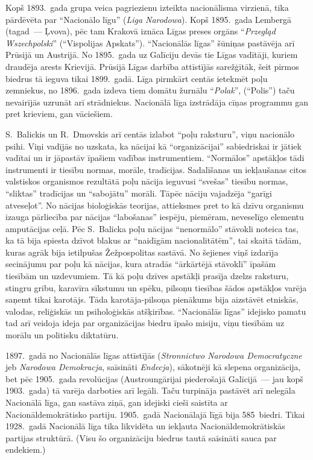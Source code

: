 \documentclass[twoside,a5paper,12pt,fleqn,openany]{extbook}
\newcommand{\pltxti}[1]{\textit{\textpolish{#1}}}
\begin{document}
Kopš 1893.~gada grupa veica pagriezienu izteikta nacionālisma virzienā, tika pārdēvēta par ``Nacionālo līgu'' (\pltxti{Liga Narodowa}). Kopš 1895.~gada Lembergā (tagad~--- Ļvova), pēc tam Krakovā iznāca Līgas preses orgāns ``\pltxti{Przegląd Wszechpolski}'' (``Vispolijas Apskats''). ``Nacionālās līgas'' šūniņas pastāvēja arī Prūsijā un Austrijā. No 1895.~gada uz Galīciju devās tie Līgas vadītāji, kuriem draudēja arests Krievijā. Prūsijā Līgas darbība attīstījās sarežģītāk, šeit pirmos biedrus tā ieguva tikai 1899.~gadā. Līga pirmkārt centās ietekmēt poļu zemniekus, no 1896.~gada izdeva tiem domātu žurnālu ``\pltxti{Polak}'', (``Polis'') taču nevairījās uzrunāt arī strādniekus. Nacionālā līga izstrādāja cīņas programmu gan pret krieviem, gan vāciešiem.

S.~Balickis un R.~Dmovskis arī centās izlabot ``poļu raksturu'', viņu nacionālo psihi. Viņi vadījās no uzskata, ka nācijai kā ``organizācijai'' sabiedriskai ir jātiek vadītai un ir jāpastāv īpašiem vadības instrumentiem. ``Normālos'' apstākļos tādi instrumenti ir tiesību normas, morāle, tradīcijas. Sadalīšanas un iekļaušanas citos valstiskos organismos rezultātā poļu nācija ieguvusi ``svešas'' tiesību normas, ``sliktas'' tradīcijas un ``sabojātu'' morāli. Tāpēc nāciju vajadzēja ``garīgi atveseļot''. No nācijas bioloģiskās teorijas, attieksmes pret to kā dzīvu organismu izauga pārliecība par nācijas ``labošanas'' iespēju, piemēram, neveselīgo elementu amputācijas ceļā. Pēc S.~Balicka poļu nācijas ``nenormālo'' stāvokli noteica tas, ka tā bija spiesta dzīvot blakus ar ``naidīgām nacionalitātēm'', tai skaitā tādām, kuras agrāk bija ietilpušas Žežpospolitas sastāvā. No šejienes viņš izdarīja secinājumu par poļu kā nācijas, kura atradās ``ārkārtējā stāvoklī'' īpašām tiesībām un uzdevumiem. Tā kā poļu dzīves apstākļi prasīja dzelzs raksturu, stingru gribu, karavīra sīkstumu un spēku, pilsoņu tiesības šādos apstākļos varēja saņemt tikai karotājs. Tāda karotāja-pilsoņa pienākums bija aizstāvēt etniskās, valodas, reliģiskās un psiholoģiskās atšķirības. ``Nacionālās līgas'' idejisko pamatu tad arī veidoja ideja par organizācijas biedru īpašo misiju, viņu tiesībām uz morālu un politisku diktatūru.

1897.~gadā no Nacionālās līgas attīstījās  (\pltxti{Stronnictwo Narodowa Democratyczne} jeb \pltxti{Narodowa Demokracja}, saīsināti \pltxti{Endecja}), sākotnēji kā slepena organizācija, bet pēc 1905.~gada revolūcijas (Austroungārijai piederošajā Galīcijā~--- jau kopš 1903.~gada) tā varēja darboties arī legāli. Taču turpināja pastāvēt arī nelegāla Nacionālā līga, gan sastāva ziņā, gan idejiski cieši saistīta ar Nacionāldemokrātisko partiju. 1905.~gadā Nacionālajā līgā bija 585~biedri. Tikai 1928.~gadā Nacionālā līga tika likvidēta un iekļauta Nacionāldemokrātiskās partijas struktūrā. (Visu šo organizāciju biedrus tautā saīsināti sauca par endekiem.)
\end{document}
